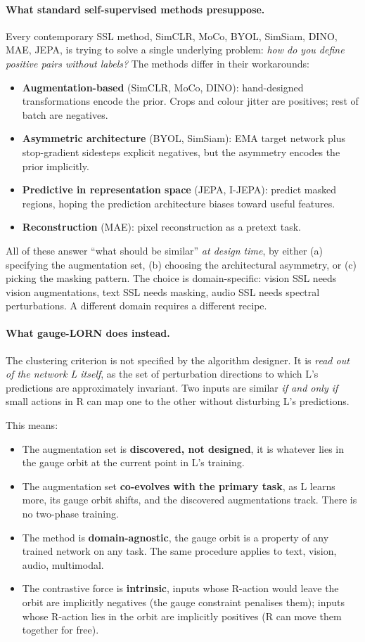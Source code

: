 \documentclass[11pt, a4paper]{article}
\theoremstyle{plain}
\theoremstyle{definition}
\theoremstyle{remark}
\begin{document}
\paragraph{What standard self-supervised methods presuppose.}
Every contemporary SSL method, SimCLR, MoCo, BYOL, SimSiam, DINO, MAE, JEPA, is trying to solve a single underlying problem: \emph{how do you define positive pairs without labels?} The methods differ in their workarounds:
\begin{itemize}[nosep]
\item \textbf{Augmentation-based} (SimCLR, MoCo, DINO): hand-designed transformations encode the prior. Crops and colour jitter are positives; rest of batch are negatives.
\item \textbf{Asymmetric architecture} (BYOL, SimSiam): EMA target network plus stop-gradient sidesteps explicit negatives, but the asymmetry encodes the prior implicitly.
\item \textbf{Predictive in representation space} (JEPA, I-JEPA): predict masked regions, hoping the prediction architecture biases toward useful features.
\item \textbf{Reconstruction} (MAE): pixel reconstruction as a pretext task.
\end{itemize}
All of these answer ``what should be similar'' \emph{at design time}, by either (a) specifying the augmentation set, (b) choosing the architectural asymmetry, or (c) picking the masking pattern. The choice is domain-specific: vision SSL needs vision augmentations, text SSL needs masking, audio SSL needs spectral perturbations. A different domain requires a different recipe.

\paragraph{What gauge-LORN does instead.}
The clustering criterion is not specified by the algorithm designer. It is \emph{read out of the network L itself}, as the set of perturbation directions to which L's predictions are approximately invariant. Two inputs are similar \emph{if and only if} small actions in R can map one to the other without disturbing L's predictions.

This means:
\begin{itemize}[nosep]
\item The augmentation set is \textbf{discovered, not designed}, it is whatever lies in the gauge orbit at the current point in L's training.
\item The augmentation set \textbf{co-evolves with the primary task}, as L learns more, its gauge orbit shifts, and the discovered augmentations track. There is no two-phase training.
\item The method is \textbf{domain-agnostic}, the gauge orbit is a property of any trained network on any task. The same procedure applies to text, vision, audio, multimodal.
\item The contrastive force is \textbf{intrinsic}, inputs whose R-action would leave the orbit are implicitly negatives (the gauge constraint penalises them); inputs whose R-action lies in the orbit are implicitly positives (R can move them together for free).
\end{itemize}
\end{document}
